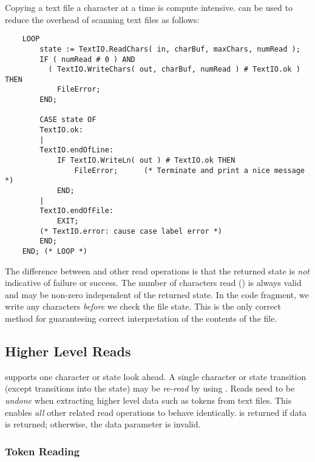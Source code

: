 Copying a text file a character at a time is compute intensive.  
 can be used to reduce the overhead
of scanning text files as follows:
\begin{verbatim}
    LOOP
        state := TextIO.ReadChars( in, charBuf, maxChars, numRead );
        IF ( numRead # 0 ) AND
          ( TextIO.WriteChars( out, charBuf, numRead ) # TextIO.ok ) THEN
            FileError;
        END;
        
        CASE state OF
        TextIO.ok:
        |
        TextIO.endOfLine:
            IF TextIO.WriteLn( out ) # TextIO.ok THEN
                FileError;      (* Terminate and print a nice message *)
            END;
        |
        TextIO.endOfFile:
            EXIT;
        (* TextIO.error: cause case label error *)
        END;
    END; (* LOOP *)
\end{verbatim}

The difference between  and other read
operations is that the returned state is {\em not} indicative of
failure or success.  The number of characters read ()
is always valid and may be non-zero independent of the returned state.
In the code fragment, we write any characters {\em before} we check
the file state.  This is the only correct method for guaranteeing 
correct interpretation of the contents of the  file.


\subsection{Higher Level  Reads}

 supports one character or state look ahead.
A single character or state transition (except transitions into
the  state) may be {\em re-read} by using 
.  Reads need to be {\em undone} when extracting
higher level data such as tokens from text files.  This enables
{\em all} other  related read operations to behave
identically.  is returned if data is returned;
otherwise, the data parameter is invalid. 

\subsubsection{Token Reading}
\label{TextIORules}

